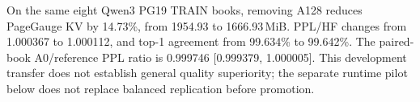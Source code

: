 On the same eight Qwen3 PG19 TRAIN books, removing A128 reduces PageGauge KV by 14.73\%, from 1954.93 to 1666.93\,MiB. PPL/HF changes from 1.000367 to 1.000112, and top-1 agreement from 99.634\% to 99.642\%. The paired-book A0/reference PPL ratio is 0.999746 [0.999379, 1.000005]. This development transfer does not establish general quality superiority; the separate runtime pilot below does not replace balanced replication before promotion.
